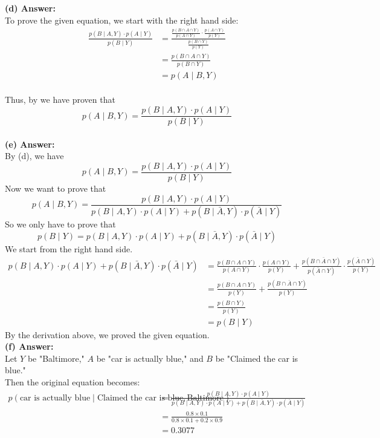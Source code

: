 \documentclass{article}
\begin{document}
\noindent
\textbf{(d) Answer:}\\
To prove the given equation, we start with the right hand side:
\begin{align*}
  \frac{p(B \mid A, Y) \cdot p(A \mid Y)}{p(B \mid Y)}
  &= \frac{\frac{p(B \cap A \cap Y)}{p(A \cap Y)} \cdot \frac{p(A \cap Y)}{p(Y)}}{\frac{p(B \cap Y)}{p(Y)}}
  \\&= \frac{p(B \cap A \cap Y)}{p(B \cap Y)}
  \\&= p(A \mid B, Y)
\end{align*}\\
Thus, by we have proven that 
$$p(A \mid B, Y) = \frac{p(B \mid A, Y) \cdot p(A \mid Y)}{p(B \mid Y)}$$\\

\noindent
\textbf{(e) Answer:}\\
By (d), we have $$p(A \mid B, Y) = \frac{p(B \mid A, Y) \cdot p(A \mid Y)}{p(B \mid Y)}$$
Now we want to prove that 
$$p(A \mid B, Y) = \frac{p(B \mid A, Y) \cdot p(A \mid Y)}{p(B \mid A, Y) \cdot p(A \mid Y) + p(B \mid \bar{A}, Y) \cdot p(\bar{A} \mid Y)}$$
So we only have to prove that 
$$p(B \mid Y) = p(B \mid A, Y) \cdot p(A \mid Y) + p(B \mid \bar{A}, Y) \cdot p(\bar{A} \mid Y)$$
We start from the right hand side.
\begin{align*}
    p(B \mid A, Y) \cdot p(A \mid Y) + p(B \mid \bar{A}, Y) \cdot p(\bar{A} \mid Y)
    &= \frac{p(B \cap A \cap Y)}{p(A \cap Y)} \cdot \frac{p(A \cap Y)}{p(Y)} + \frac{p(B \cap \bar{A} \cap Y)}{p(\bar{A} \cap Y)} \cdot \frac{p(\bar{A} \cap Y)}{p(Y)}
    \\&= \frac{p(B \cap A \cap Y)}{p(Y)} + \frac{p(B \cap \bar{A} \cap Y)}{p(Y)}
    \\&= \frac{p(B \cap Y)}{p(Y)}
    \\&= p(B \mid Y)
\end{align*}
By the derivation above, we proved the given equation.\\

\noindent
\textbf{(f) Answer:}\\
Let $Y$ be "Baltimore," $A$ be "car is actually blue," and $B$ be "Claimed the car is blue."\\
Then the original equation becomes:\\
\begin{align*}
    p(\text{car is actually blue} \mid \text{Claimed the car is blue}, \text{Baltimore})
    &= \frac{p(B \mid A, Y) \cdot p(A \mid Y)}{p(B \mid A, Y) \cdot p(A \mid Y) + p(B \mid \bar{A}, Y) \cdot p(\bar{A} \mid Y)}
    \\&= \frac{0.8 \times 0.1}{0.8 \times 0.1 + 0.2 \times 0.9}
    \\&= 0.3077
\end{align*}
\end{document}
